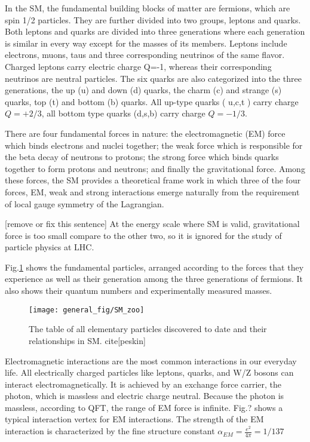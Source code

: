 In the SM, the fundamental building blocks of matter are fermions, which are spin 1/2 particles. They are further divided into two groups, leptons and quarks. Both leptons and quarks are divided into three generations where each generation is similar in every way except for the masses of its members. Leptons include electrons, muons, taus and three corresponding neutrinos of the same flavor. Charged leptons carry electric charge Q=-1, whereas their corresponding neutrinos are neutral particles. The six quarks are also categorized into the three generations, the up (u) and down (d) quarks, the charm (c) and strange (s) quarks, top (t) and bottom (b) quarks. All up-type quarks ( u,c,t ) carry charge $Q=+2/3$, all bottom type quarks (d,s,b) carry charge $Q=-1/3$.

There are four fundamental forces in nature: the electromagnetic (EM) force which binds electrons and nuclei together; the weak force which is responsible for the beta decay of neutrons to protons; the strong force which binds quarks together to form protons and neutrons; and finally the gravitational force. Among these forces, the SM provides a theoretical frame work in which three of the four forces, EM, weak and strong interactions emerge naturally from the requirement of local gauge symmetry of the Lagrangian. 

[remove or fix this sentence] At the energy scale where SM is valid, gravitational force is too small compare to the other two, so it is ignored for the study of particle physics at LHC.

Fig.\ref{fig:SM_zoo} shows the fundamental particles, arranged according to the forces that they experience as well as their generation among the three generations of fermions. It also shows their quantum numbers and experimentally measured masses.  

 \begin{figure}[hbt]
	\begin{center}
		\texttt{[image: general\_fig/SM\_zoo]}
		\caption{\small The table of all elementary particles discovered to date and their relationships in SM. cite[peskin]}
		\label{fig:SM_zoo}
	\end{center}
\end{figure}


Electromagnetic interactions are the most common interactions in our everyday life. All electrically charged particles like leptons, quarks, and W/Z bosons can interact electromagnetically. It is achieved by an exchange force carrier, the photon, which is massless and electric charge neutral. Because the photon is massless, according to QFT, the range of EM force is infinite. Fig.? shows a typical interaction vertex for EM interactions. The strength of the EM interaction is characterized by the fine structure constant $\alpha_{EM}=\frac{e^2}{4\pi}=1/137$


